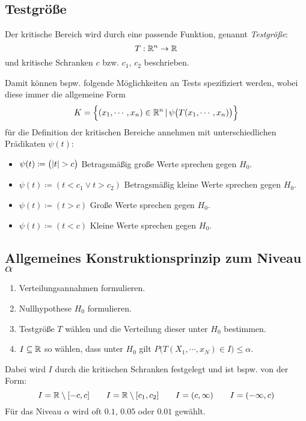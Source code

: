         \subsection{Testgröße}
            Der kritische Bereich wird durch eine passende Funktion, genannt \textit{Testgröße}:
            \begin{equation*}
                T : \mathbb{R}^n \rightarrow \mathbb{R}
            \end{equation*}
            und kritische Schranken \(c\) bzw. \(c_1\), \(c_2\) beschrieben.
            
            Damit können bspw. folgende Möglichkeiten an Tests spezifiziert werden, wobei diese immer die allgemeine Form \[ K = \Big\{ (x_1, \cdots, x_n) \in \mathbb{R}^n \,\vert\, \psi\big(T(x_1, \cdots, x_n)\big) \Big\} \] für die Definition der kritischen Bereiche annehmen mit unterschiedlichen Prädikaten \( \psi(t) \):
            \begin{itemize}
            	\item \( \psi(t) \coloneqq \big(\abs{t} > c\big) \)  \tabto{4.5cm} Betragsmäßig große Werte sprechen gegen \(H_0\).
            	\item \( \psi(t) \coloneqq (t < c_1 \lor t > c_2) \) \tabto{4.5cm} Betragsmäßig kleine Werte sprechen gegen \(H_0\).
            	\item \( \psi(t) \coloneqq (t > c) \)                \tabto{4.5cm} Große Werte sprechen gegen \(H_0\).
            	\item \( \psi(t) \coloneqq (t < c) \)                \tabto{4.5cm} Kleine Werte sprechen gegen \(H_0\).
            \end{itemize}

        \subsection{Allgemeines Konstruktionsprinzip zum Niveau \(\alpha\)}
            \begin{enumerate}
            	\item Verteilungsannahmen formulieren.
            	\item Nullhypothese \(H_0\) formulieren.
            	\item Testgröße \(T\) wählen und die Verteilung dieser unter \(H_0\) bestimmen.
            	\item \(I \subseteq \mathbb{R} \) so wählen, dass unter \(H_0\) gilt \( P\big(T(X_1, \cdots, x_N) \in I\big) \leq \alpha \).
            \end{enumerate}
            Dabei wird \(I\) durch die kritischen Schranken festgelegt und ist bspw. von der Form:
            \begin{equation*}
	            I = \mathbb{R} \setminus [-c, c] \qquad I = \mathbb{R} \setminus [c_1, c_2] \qquad I = (c, \infty) \qquad I = (-\infty, c)
            \end{equation*}
            Für das Niveau \( \alpha \) wird oft \( 0.1\), \(0.05\) oder \(0.01 \) gewählt.

